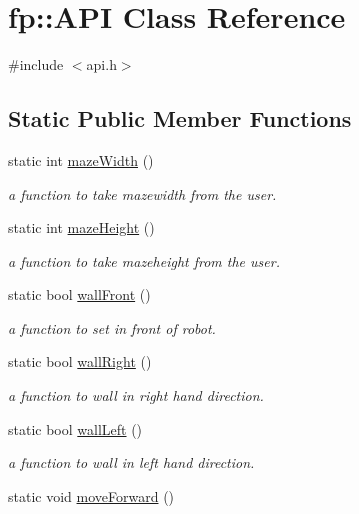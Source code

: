 \hypertarget{classfp_1_1_a_p_i}{}\section{fp\+:\+:A\+PI Class Reference}
\label{classfp_1_1_a_p_i}


{\ttfamily \#include $<$api.\+h$>$}

\subsection*{Static Public Member Functions}
\begin{DoxyCompactItemize}
\item 
static int \hyperlink{classfp_1_1_a_p_i_af8adb8d6fe6b921de4172111b32fc710}{maze\+Width} ()
\begin{DoxyCompactList}\small\item\em a function to take mazewidth from the user. \end{DoxyCompactList}\item 
static int \hyperlink{classfp_1_1_a_p_i_a7d9285544497a39f87e841fcfe49deab}{maze\+Height} ()
\begin{DoxyCompactList}\small\item\em a function to take mazeheight from the user. \end{DoxyCompactList}\item 
static bool \hyperlink{classfp_1_1_a_p_i_a52c23ca6b94cd561727e63c4a568bb86}{wall\+Front} ()
\begin{DoxyCompactList}\small\item\em a function to set in front of robot. \end{DoxyCompactList}\item 
static bool \hyperlink{classfp_1_1_a_p_i_aeaebbd3b022bc0ed768dc3112ea1db94}{wall\+Right} ()
\begin{DoxyCompactList}\small\item\em a function to wall in right hand direction. \end{DoxyCompactList}\item 
static bool \hyperlink{classfp_1_1_a_p_i_a49efec34a5521b6a7f202759f7f758d2}{wall\+Left} ()
\begin{DoxyCompactList}\small\item\em a function to wall in left hand direction. \end{DoxyCompactList}\item 
static void \hyperlink{classfp_1_1_a_p_i_a4863c0dec23d677c5eefb7c03088b29c}{move\+Forward} ()

\end{DoxyCompactItemize}

